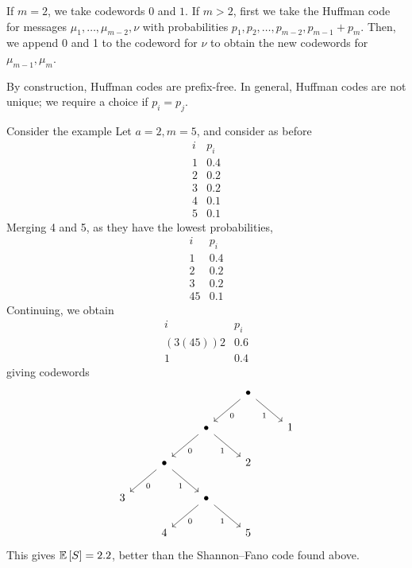 If \( m = 2 \), we take codewords \( 0 \) and \( 1 \).
If \( m > 2 \), first we take the Huffman code for messages \( \mu_1, \dots, \mu_{m-2}, \nu \) with probabilities \( p_1, p_2, \dots, p_{m-2}, p_{m-1} + p_m \).
Then, we append 0 and 1 to the codeword for \( \nu \) to obtain the new codewords for \( \mu_{m-1}, \mu_m \).
\begin{remark}
    By construction, Huffman codes are prefix-free.
    In general, Huffman codes are not unique; we require a choice if \( p_i = p_j \).
\end{remark}
\begin{example}
    Consider the example
    Let \( a = 2, m = 5 \), and consider as before
    \[ \begin{array}{cc}
            i & p_i \\
            1 & 0.4 \\
            2 & 0.2 \\
            3 & 0.2 \\
            4 & 0.1 \\
            5 & 0.1
    \end{array} \]
    Merging 4 and 5, as they have the lowest probabilities,
    \[ \begin{array}{cc}
        i & p_i \\
        1 & 0.4 \\
        2 & 0.2 \\
        3 & 0.2 \\
        45 & 0.1
    \end{array} \]
    Continuing, we obtain
    \[ \begin{array}{cc}
        i & p_i \\
        (3(45))2 & 0.6 \\
        1 & 0.4
    \end{array} \]
    giving codewords
    \[\begin{tikzcd}
        &&& \bullet \\
        && \bullet && 1 \\
        & \bullet && 2 \\
        3 && \bullet \\
        & 4 && 5
        \arrow["0", from=3-2, to=4-1]
        \arrow["1"', from=3-2, to=4-3]
        \arrow["0", from=4-3, to=5-2]
        \arrow["1"', from=4-3, to=5-4]
        \arrow["0", from=2-3, to=3-2]
        \arrow["1"', from=2-3, to=3-4]
        \arrow["0", from=1-4, to=2-3]
        \arrow["1"', from=1-4, to=2-5]
    \end{tikzcd}\]
    This gives \( \mathbb{E}\left[{S}\right] = 2.2 \), better than the Shannon--Fano code found above.
\end{example}
